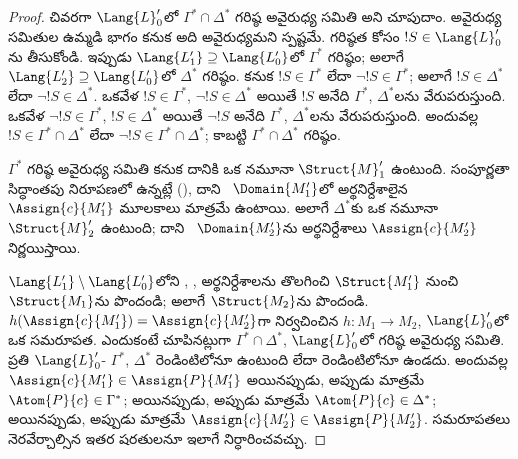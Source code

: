 \documentclass[../../../include/open-logic-section]{subfiles}
\begin{document}
\begin{proof}
చివరగా $\Lang{L}'_0$లో $\Gamma^* \cap \Delta^*$ గరిష్ఠ అవైరుధ్య
సమితి అని చూపుదాం. అవైరుధ్య సమితుల ఉమ్మడి భాగం కనుక అది అవైరుధ్యమని
స్పష్టమే. గరిష్ఠత కోసం $!S \in \Lang{L}'_0$ను తీసుకోండి. ఇప్పుడు
$\Lang{L'_1} \supseteq \Lang{L'_0}$లో $\Gamma^*$ గరిష్ఠం; అలాగే
$\Lang{L'_2} \supseteq \Lang{L'_0}$లో $\Delta^*$ గరిష్ఠం. కనుక
$!S \in \Gamma^*$ లేదా $\lnot !S \in \Gamma^*$; అలాగే
$!S \in \Delta^*$ లేదా $\lnot !S \in \Delta^*$. ఒకవేళ
$!S \in \Gamma^*$, $\lnot !S \in \Delta^*$ అయితే $!S$ అనేది
$\Gamma^*$, $\Delta^*$లను వేరుపరుస్తుంది. ఒకవేళ
$\lnot !S \in \Gamma^*$, $!S \in \Delta^*$ అయితే $\lnot !S$ అనేది
$\Gamma^*$, $\Delta^*$లను వేరుపరుస్తుంది. అందువల్ల
$!S \in \Gamma^* \cap \Delta^*$ లేదా
$\lnot !S \in \Gamma^* \cap \Delta^*$; కాబట్టి
$\Gamma^* \cap \Delta^*$ గరిష్ఠం.

$\Gamma^*$ గరిష్ఠ అవైరుధ్య సమితి కనుక దానికి ఒక నమూనా
$\Struct{M}'_1$ ఉంటుంది. సంపూర్ణతా సిద్ధాంతపు నిరూపణలో ఉన్నట్లే
(), దాని
~$\Domain{M'_1}$లో
 అర్థనిర్దేశాలైన
$\Assign{c}{M'_1}$ మూలకాలు మాత్రమే ఉంటాయి. అలాగే $\Delta^*$కు ఒక
నమూనా $\Struct{M}'_2$ ఉంటుంది; దాని
~$\Domain{M'_2}$ను
 అర్థనిర్దేశాలు
$\Assign{c}{M'_2}$ నిర్ణయిస్తాయి.

$\Lang{L'_1} \setminus \Lang{L'_0}$లోని
,
,
 అర్థనిర్దేశాలను తొలగించి
$\Struct{M'_1}$ నుంచి $\Struct{M_1}$ను పొందండి; అలాగే
$\Struct{M_2}$ను పొందండి. $h(\Assign{c}{M'_1}) =
\Assign{c}{M'_2}$గా నిర్వచించిన $h \colon M_1 \to M_2$,
$\Lang{L}'_0$లో ఒక సమరూపత. ఎందుకంటే చూపినట్లుగా
$\Gamma^* \cap \Delta^*$, $\Lang{L}'_0$లో గరిష్ఠ అవైరుధ్య సమితి.
ప్రతి $\Lang{L}'_0$-
 $\Gamma^*$, $\Delta^*$ రెండింటిలోనూ
ఉంటుంది లేదా రెండింటిలోనూ ఉండదు. అందువల్ల
$\Assign{c}{M'_1} \in \Assign{P}{M'_1}$ అయినప్పుడు, అప్పుడు మాత్రమే
$\Atom{P}{c} \in \Gamma^*$; అయినప్పుడు, అప్పుడు మాత్రమే
$\Atom{P}{c} \in \Delta^*$; అయినప్పుడు, అప్పుడు మాత్రమే
$\Assign{c}{M'_2} \in \Assign{P}{M'_2}$. సమరూపతలు నెరవేర్చాల్సిన ఇతర
షరతులనూ ఇలాగే నిర్ధారించవచ్చు.


\end{proof}
\end{document}
